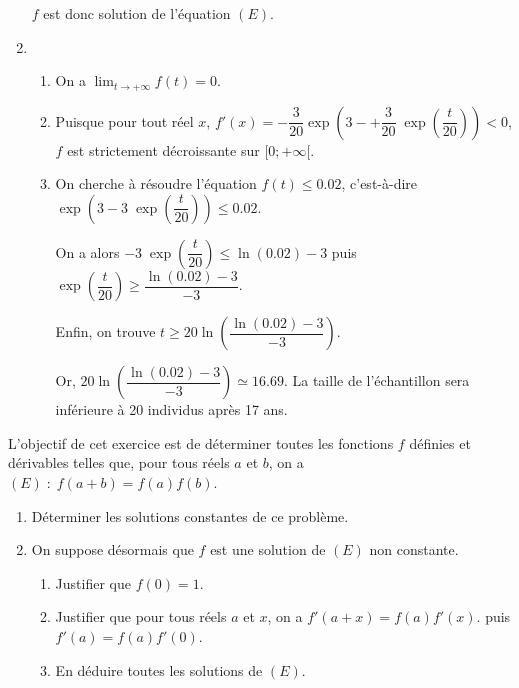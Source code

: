 \documentclass[11pt,fleqn, openany]{book} %
\begin{document}
\begin{solution}
\begin{enumerate}
 \(f\) est donc solution de l'équation \((E)\).
\item  

\begin{enumerate}\item  On a \(\lim_{t \to +\infty} f(t)=0\).
\item  Puisque pour tout réel \(x\), \(f'(x)=-\dfrac{3}{20}\exp\left(3-+\dfrac{3}{20}\;\exp\left(\dfrac{t}{20}\right)\right)<0\), \(f\) est strictement décroissante sur \([0;+\infty[\).
\item  On cherche à résoudre l'équation \(f(t)\leqslant 0.02\), c'est-à-dire $\exp\left(3-3\;\exp\left(\dfrac{t}{20}\right)\right) \leqslant 0.02$.

On a alors $ -3\;\exp\left(\dfrac{t}{20}\right) \leqslant \ln(0.02)-3$ puis $\exp\left(\dfrac{t}{20}\right) \geqslant \dfrac{\ln(0.02)-3}{-3}$.

Enfin, on trouve $t \geqslant 20 \ln\left( \dfrac{\ln(0.02)-3}{-3} \right)$.

 
Or,  \(20 \ln\left( \dfrac{\ln(0.02)-3}{-3} \right) \simeq 16.69\).
 La taille de l'échantillon sera inférieure à 20 individus après 17 ans.
 \end{enumerate}
 \end{enumerate}

\end{solution}

\begin{exercise}L'objectif de cet exercice est de déterminer toutes les fonctions $f$ définies et dérivables telles que, pour tous réels $a$ et $b$, on a $(E) \; : \; f(a+b)=f(a)f(b)$.
\begin{enumerate}
\item Déterminer les solutions constantes de ce problème.
\item On suppose désormais que $f$ est une solution de $(E)$ non constante.
\begin{enumerate}
\item Justifier que $f(0)=1$.
\item Justifier que pour tous réels $a$ et $x$, on a $f'(a+x)=f(a)f'(x)$. puis $f'(a)=f(a)f'(0)$.
\item En déduire toutes les solutions de $(E)$.
\end{enumerate}
\end{enumerate}
\end{exercise}
\end{document}
